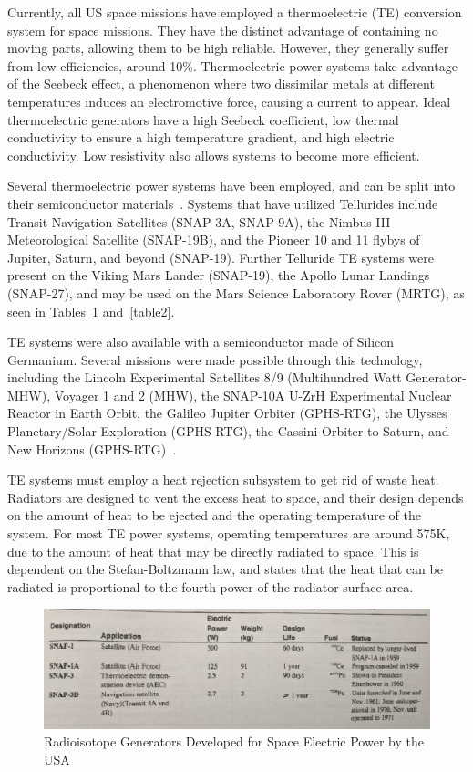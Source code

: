 \documentclass{article}
\begin{document}
Currently, all US space missions have employed a thermoelectric (TE) conversion system for space missions. They have the distinct advantage of containing no moving parts, allowing them to be high reliable. However, they generally suffer from low efficiencies, around 10\%. Thermoelectric power systems take advantage of the Seebeck effect, a phenomenon where two dissimilar metals at different temperatures induces an electromotive force, causing a current to appear. Ideal thermoelectric generators have a high Seebeck coefficient, low thermal conductivity to ensure a high temperature gradient, and high electric conductivity. Low resistivity also allows systems to become more efficient.~\cite{buden1979selection}

	Several thermoelectric power systems have been employed, and can be split into their semiconductor materials~\cite{anderson1983space}. Systems that have utilized Tellurides include Transit Navigation Satellites (SNAP-3A, SNAP-9A), the Nimbus III Meteorological Satellite (SNAP-19B), and the Pioneer 10 and 11 flybys of Jupiter, Saturn, and beyond (SNAP-19). Further Telluride TE systems were present on the Viking Mars Lander (SNAP-19), the Apollo Lunar Landings (SNAP-27), and may be used on the Mars Science Laboratory Rover (MRTG), as seen in Tables~\ref{table1} and~\ref{table2}. 

	TE systems were also available with a semiconductor made of Silicon Germanium. Several missions were made possible through this technology, including the Lincoln Experimental Satellites 8/9 (Multihundred Watt Generator-MHW), Voyager 1 and 2 (MHW), the SNAP-10A U-ZrH Experimental Nuclear Reactor in Earth Orbit, the Galileo Jupiter Orbiter (GPHS-RTG), the Ulysses Planetary/Solar Exploration (GPHS-RTG), the Cassini Orbiter to Saturn, and New Horizons (GPHS-RTG)~\cite{dassoulas2007rtgs}.

	TE systems must employ a heat rejection subsystem to get rid of waste heat. Radiators are designed to vent the excess heat to space, and their design depends on the amount of heat to be ejected and the operating temperature of the system. For most TE power systems, operating temperatures are around 575K, due to the amount of heat that may be directly radiated to space. This is dependent on the Stefan-Boltzmann law, and states that the heat that can be radiated is proportional to the fourth power of the radiator surface area.


\begin{figure}[]
	\centering
	\includegraphics[height=0.20\textheight]{fig/table1}
	\caption[Radioisotope Generators Developed for Space Electric Power by the USA]{Radioisotope Generators Developed for Space Electric Power by the USA~\cite{buden2011spacebook1}}
	\label{table1}
\end{figure}
\end{document}
